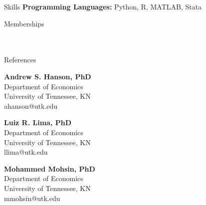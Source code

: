 \documentclass{resume}
\begin{document}
\begin{rSection}{Skills}
    \textbf{Programming Languages:} Python, R, MATLAB, Stata
    \end{rSection}

\begin{rSection}{Memberships}
    \\
    \\
    \\
    \end{rSection}

\begin{rSection}{References} 

    \begin{multicols}{3}
        \textbf{Andrew S. Hanson, PhD}\\
        Department of Economics\\
        University of Tennessee, KN\\
        ahanson@utk.edu
        
        \columnbreak
        
        \textbf{Luiz R. Lima, PhD}\\
        Department of Economics\\
        University of Tennessee, KN\\
        llima@utk.edu
        
        \columnbreak
        
        \textbf{Mohammed Mohsin, PhD}\\
        Department of Economics\\
        University of Tennessee, KN\\
        mmohsin@utk.edu
    \end{multicols}
        
\end{rSection}
\end{document}
